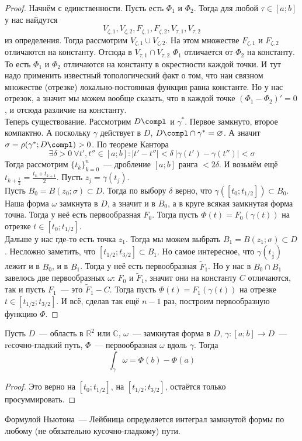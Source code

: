 \documentclass{article}
\begin{document}
    \begin{proof}
        Начнём с единственности. Пусть есть $\Phi_1$ и $\Phi_2$. Тогда для любой $\tau\in[a;b]$ у нас найдутся
        $$
        V_{\zeta,1},V_{\zeta,2},F_{\zeta,1},F_{\zeta,2},V_{\tau,1},V_{\tau,2}
        $$
        из определения. Тогда рассмотрим $V_{\zeta,1}\cup V_{\zeta,2}$. На этом множестве $F_{\zeta,1}$ и $F_{\zeta,2}$ отличаются на константу. Отсюда в $V_{\tau,1}\cap V_{\tau,2}$ $\Phi_1$ отличается от $\Phi_2$ на константу. То есть $\Phi_1$ и $\Phi_2$ отличаются на константу в окрестности каждой точки. И тут надо применить известный топологический факт о том, что наи связном множестве (отрезке) локально-постоянная функция равна константе. Но у нас отрезок, а значит мы можем вообще сказать, что в каждой точке $(\Phi_1-\Phi_2)'=0$, и отсюда различие на константу.\\
        Теперь существование. Рассмотрим $D\compl$ и $\gamma^*$. Первое замкнуто, второе компактно. А поскольку $\gamma$ действует в $D$, $D\compl\cap\gamma^*=\varnothing$. А значит $\sigma=\rho(\gamma^*;D\compl)>0$. По теореме Кантора
        $$
        \exists\delta>0~\forall t',t''\in[a;b]:|t'-t''|<\delta~|\gamma(t')-\gamma(t'')|<\sigma
        $$
        Тогда рассмотрим $\{t_k\}_{k=0}^n$~--- дробление $[a;b]$ ранга $<2\delta$. И возьмём ещё $t_{k+\frac12}=\frac{t_k+t_{k+1}}2$. Пусть $z_j=\gamma(t_j)$.\\
        Пусть $B_0=B(z_0;\sigma)\subset D$. Тогда по выбору $\delta$ верно, что $\gamma([t_0;t_{1/2}])\subset B_0$. Наша форма $\omega$ замкнута в $D$, а значит и в $B_0$, а в круге всякая замкнутая форма точна. Тогда у неё есть первообразная $F_0$. Тогда пусть $\Phi(t)=F_0(\gamma(t))$ на отрезке $t\in[t_0;t_{1/2}]$.\\
        Дальше у нас где-то есть точка $z_1$. Тогда мы можем выбрать $B_1=B(z_1;\sigma)\subset D$. Несложно заметить, что $[t_{1/2};t_{3/2}]\subset B_1$. Но самое интересное, что $\gamma\left(t_{\frac12}\right)$ лежит и в $B_0$, и в $B_1$. Тогда у неё есть первообразная $\tilde F_1$. Но у нас в $B_0\cap B_1$ завелось две первообразных $\omega$: $F_0$ и $\tilde F_1$, значит они на константу $C$ отличаются, так и пусть $F_1$~--- это $\tilde F_1-C$. Тогда пусть $\Phi(t)=F_1(\gamma(t))$ на отрезке $t\in[t_{1/2};t_{3/2}]$. И всё, сделав так ещё $n-1$ раз, построим первообразную функцию $\Phi$.
    \end{proof}
    \begin{corollary}
        \label{Н-Л вдоль пути}
        Пусть $D$~--- область в $\mathbb R^2$ или $\mathbb C$, $\omega$~--- замкнутая форма в $D$, $\gamma\colon[a;b]\to D$~--- reсочно-гладкий путь, $\Phi$~--- первообразная $\omega$ вдоль $\gamma$. Тогда
        $$
        \int_\gamma\omega=\Phi(b)-\Phi(a)
        $$
    \end{corollary}
    \begin{proof}
        Это верно на $[t_0;t_{1/2}]$, на $[t_{1/2};t_{3/2}]$, остаётся только просуммировать.
    \end{proof}
    \begin{remark}
        Формулой Ньютона~--- Лейбница определяется интеграл замкнутой формы по любому (не обязательно кусочно-гладкому) пути.
    \end{remark}
\end{document}
